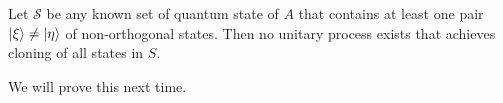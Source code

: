 \documentclass[a4paper]{article}
\begin{document}
\begin{theorem}
	Let $\mathcal{S}$ be any known set of quantum state of $A$ that contains at least one pair $\ket{\xi} \neq \ket{\eta}$ of non-orthogonal states.
	Then no unitary process exists that achieves cloning of all states in $S$.
\end{theorem}

We will prove this next time.
\end{document}
